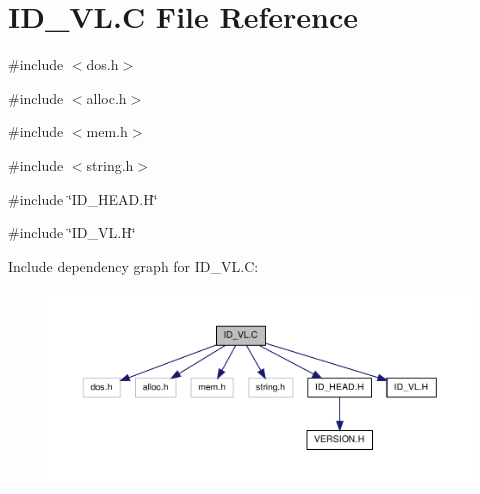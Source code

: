 \hypertarget{ID__VL_8C}{
\section{ID\_\-VL.C File Reference}
\label{ID__VL_8C}
}
{\ttfamily \#include $<$dos.h$>$}\par
{\ttfamily \#include $<$alloc.h$>$}\par
{\ttfamily \#include $<$mem.h$>$}\par
{\ttfamily \#include $<$string.h$>$}\par
{\ttfamily \#include \char`\"{}ID\_\-HEAD.H\char`\"{}}\par
{\ttfamily \#include \char`\"{}ID\_\-VL.H\char`\"{}}\par
Include dependency graph for ID\_\-VL.C:
\nopagebreak
\begin{figure}[H]
\begin{center}
\leavevmode
\includegraphics[width=400pt]{ID__VL_8C__incl}
\end{center}
\end{figure}

